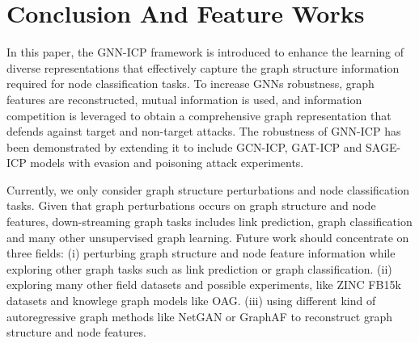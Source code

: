 \documentclass[conference]{IEEEtran}
\begin{document}
\section{Conclusion And Feature Works}

In this paper, the GNN-ICP framework is introduced to enhance the learning of diverse representations that effectively capture the graph structure information required for node classification tasks. To increase GNNs robustness, graph features are reconstructed, mutual information is used, and information competition is leveraged to obtain a comprehensive graph representation that defends against target and non-target attacks. 
The robustness of GNN-ICP has been demonstrated by extending it to include GCN-ICP, GAT-ICP and SAGE-ICP models with evasion and poisoning attack experiments. 

Currently, we only consider graph structure perturbations and node classification tasks. Given that graph perturbations occurs on graph structure and node features, down-streaming graph tasks includes link prediction, graph classification and many other unsupervised graph learning. Future work should concentrate on three fields: (i) perturbing graph structure and node feature information while exploring other graph tasks such as link prediction or graph classification. (ii) exploring  many other field datasets and possible experiments, like ZINC\cite{Sterling2015ZINC1} FB15k \cite{Bordes2013TranslatingEF} datasets and knowlege graph models like OAG\cite{Zhang2019OAGTL}. (iii) using different kind of autoregressive graph methods like NetGAN\cite{Bojchevski2018NetGANGG} or GraphAF\cite{Shi2020GraphAFAF} to reconstruct graph structure and node features.



\end{document}
